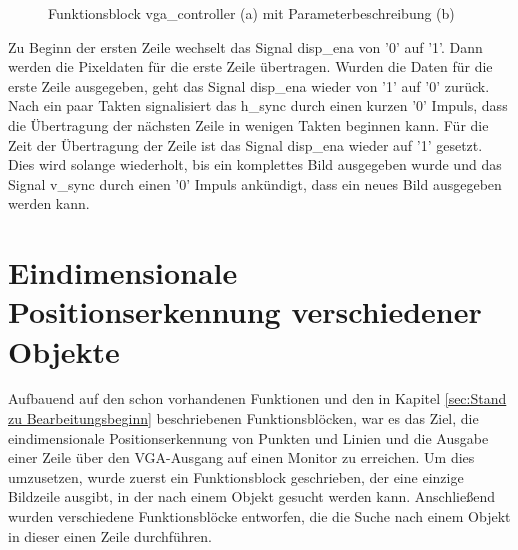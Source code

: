 \documentclass[ngerman,12pt]{article} %
\begin{document}
{\begin{figure}[h!tb]
  \centering
  \qquad
  \caption[Funktionsblock vga\_controller mit Parameterbeschreibung]{\label{pic:vga_controller}Funktionsblock vga\_controller (a) mit Parameterbeschreibung (b)}
\end{figure}

Zu Beginn der ersten Zeile wechselt das Signal disp\_ena von '0' auf '1'. Dann werden die Pixeldaten für die erste Zeile übertragen. Wurden die Daten für die erste Zeile ausgegeben, geht das Signal disp\_ena wieder von '1' auf '0'  zurück. Nach ein paar Takten signalisiert das h\_sync durch einen kurzen '0' Impuls, dass die Übertragung der nächsten Zeile in wenigen Takten beginnen kann. Für die Zeit der Übertragung der Zeile ist das Signal disp\_ena wieder auf '1' gesetzt. Dies wird solange wiederholt, bis ein komplettes Bild ausgegeben wurde und das Signal v\_sync durch einen '0' Impuls ankündigt, dass ein neues Bild ausgegeben werden kann.
\clearpage





\section{Eindimensionale Positionserkennung verschiedener Objekte}
\label{sec:Eindimensionale Positionserkennung}
Aufbauend auf den schon vorhandenen Funktionen und den in Kapitel \ref {sec:Stand zu Bearbeitungsbeginn} beschriebenen Funktionsblöcken, war es das Ziel, die eindimensionale Positionserkennung von Punkten und Linien und die Ausgabe einer Zeile über den VGA-Ausgang auf einen Monitor zu erreichen. Um dies umzusetzen, wurde zuerst ein Funktionsblock geschrieben, der eine einzige Bildzeile ausgibt, in der nach einem Objekt gesucht werden kann. Anschließend wurden verschiedene Funktionsblöcke entworfen, die die Suche nach einem Objekt in dieser einen Zeile durchführen.



}
\end{document}
